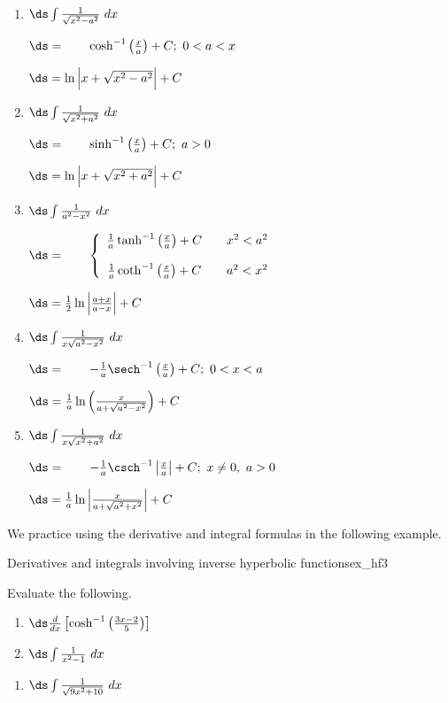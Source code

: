 \begin{formulabox}
\label{idea:hyperbolic_inverse_integrals}
{%
\begin{enumerate}
\item \parbox{70pt}{$\ds\int \frac{1}{\sqrt{x^2-a^2}}\ dx$} \parbox{180pt}{$\ds=\qquad \cosh^{-1}\left(\frac xa\right)+C;\ 0<a<x$} $\ds=\ln\Big|x+\sqrt{x^2-a^2}\Big|+C$

\item \parbox{70pt}{$\ds\int \frac{1}{\sqrt{x^2+a^2}}\ dx$} \parbox{180pt}{$\ds=\qquad \sinh^{-1}\left(\frac xa\right)+C;\ a>0$} $\ds=\ln\Big|x+\sqrt{x^2+a^2}\Big|+C$

\item \parbox{70pt}{$\ds\int \frac{1}{a^2-x^2}\ dx$} \parbox{180pt}{$\ds=\qquad \left\{\begin{array}{ccc} \frac1a\tanh^{-1}\left(\frac xa\right)+C & & x^2<a^2 \\ \\
\frac1a\coth^{-1}\left(\frac xa\right)+C & & a^2<x^2 \end{array}\right.$} $\ds=\frac12\ln\left|\frac{a+x}{a-x}\right|+C$

\item \parbox{70pt}{$\ds\int \frac{1}{x\sqrt{a^2-x^2}}\ dx $} \parbox{180pt}{$\ds=\qquad -\frac1a\sech^{-1}\left(\frac xa\right)+C;\ 0<x<a$} $\ds= \frac1a \ln\left(\frac{x}{a+\sqrt{a^2-x^2}}\right)+C $

\item	\parbox{70pt}{$\ds\int \frac{1}{x\sqrt{x^2+a^2}}\ dx $} \parbox{180pt}{$\ds=\qquad -\frac1a\csch^{-1}\left|\frac xa\right| + C;\ x\neq 0,\ a>0$}$\ds= \frac1a \ln\left|\frac{x}{a+\sqrt{a^2+x^2}}\right|+C $
\end{enumerate}
}
\end{formulabox}

We practice using the derivative and integral formulas in the following example.\\


\begin{example}{Derivatives and integrals involving inverse hyperbolic functions}{ex_hf3}
{Evaluate the following.

\noindent%
\begin{minipage}[t]{.5\textwidth}
\begin{enumerate}
\item	$\ds \frac{d}{dx}\left[\cosh^{-1}\left(\frac{3x-2}{5}\right)\right]$
\item	$\ds \int\frac{1}{x^2-1}\ dx$
\end{enumerate}
\end{minipage}
\begin{minipage}[t]{.5\textwidth}
\begin{enumerate}\addtocounter{enumi}{2}
\item	$\ds \int \frac{1}{\sqrt{9x^2+10}}\ dx$
\end{enumerate}
\end{minipage}
}
\end{example}



